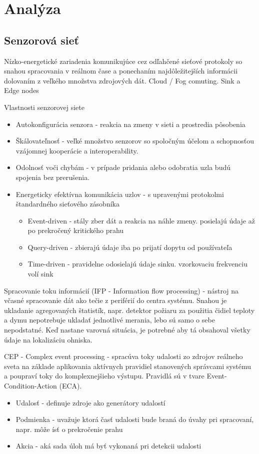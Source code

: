 \chapter{Analýza}

\section{Senzorová sieť}
Nízko-energetické zariadenia komunikujúce cez odľahčené sieťové protokoly so snahou spracovania v reálnom čase a ponechaním najdôležitejších informácii dolovaním z veľkého množstva zdrojových dát. Cloud / Fog comuting. Sink a Edge nodes

Vlastnosti senzorovej siete
\begin{itemize}
\itemsep0em 
\item Autokonfigurácia senzora - reakcia na zmeny v sieti a prostredia pôsobenia
\item Škálovateľnosť - veľké množstvo senzorov so spoločným účelom a schopnosťou vzájomnej kooperácie a interoperability.
\item Odolnosť voči chybám - v prípade pridania alebo odobratia uzla budú spojenia bez prerušenia.
\item Energeticky efektívna komunikácia uzlov - s upravenými protokolmi štandardného sieťového zásobníka
\begin{itemize}
\itemsep0em 
\item Event-driven - stály zber dát a reakcia na náhle zmeny. posielajú údaje až po prekročený kritického prahu
\item Query-driven - zbierajú údaje iba po prijatí dopytu od používateľa
\item Time-driven - pravidelne odosielajú údaje sinku. vzorkovaciu frekvenciu volí sink
\end{itemize}
\end{itemize}
\cite{wsn-overview}

Spracovanie toku informácií (IFP - Information flow processing) - nástroj na včasné spracovanie dát ako tečie z periférií do centra systému. Snahou je ukladanie agregovaných štatistík, napr. detektor požiaru za použitia čidiel teploty a dymu nepotrebuje ukladať jednotlivé merania, lebo sú samo o sebe nepodstatné. Keď nastane varovná situácia, je potrebné aby tá obsahoval všetky údaje na lokalizáciu ohniska.

CEP - Complex event processing - spracúva toky udalosti zo zdrojov reálneho sveta na základe aplikovania aktívnych pravidiel stanovených správcami systému a poupraví toky do komplexnejšieho výstupu. Pravidlá sú v tvare Event-Condition-Action (ECA).
\begin{itemize}
\itemsep0em
\item Udalosť - definuje zdroje ako generátory udalostí
\item Podmienka - uvažuje ktorá časť udalosti bude braná do úvahy pri spracovaní, napr. môže ísť o prekročenie prahu
\item Akcia - aká sada úloh má byť vykonaná pri detekcii udalosti
\end{itemize}

